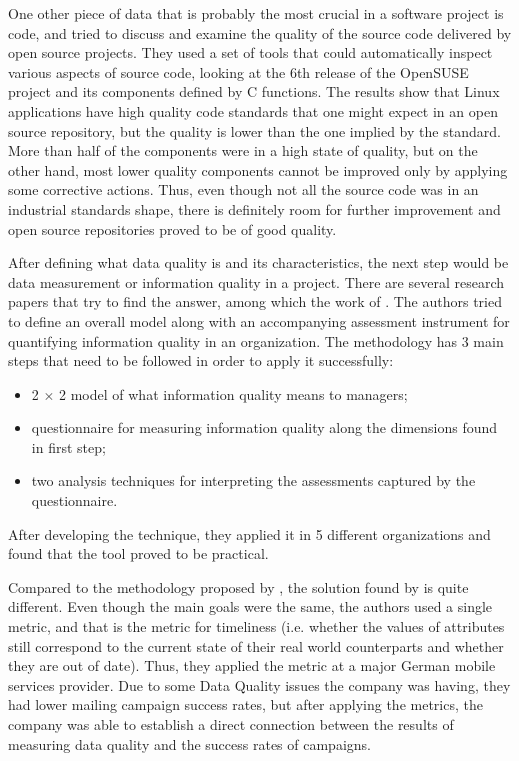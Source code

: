 \documentclass[11pt,english,twocolumn]{article}
\begin{document}
One other piece of data that is probably the most crucial in a software project
is code, and \cite{stamelos2002code} tried to discuss and examine the quality
of the source code delivered by open source projects. They used a set of tools
that could automatically inspect various aspects of source code, looking at
the 6th release of the OpenSUSE project and its components defined by C
functions. The results show that Linux applications have high quality 
code standards that one might expect in an open source repository, but 
the quality is lower than the one implied by the standard. More than half
of the components were in a high state of quality, but on the other hand, 
most lower quality components cannot be improved only by applying some
corrective actions. Thus, even though not all the source code was in 
an industrial standards shape, there is definitely room for further 
improvement and open source repositories proved to be of good quality.

After defining what data quality is and its characteristics, the next 
step would be data measurement or information quality in a project. 
There are several research papers that try to find the answer, among which the 
work of \cite{lee2002aimq}. The authors tried to define an overall model along 
with an accompanying assessment instrument for quantifying information quality 
in an organization. The methodology has 3 main steps that need to be followed 
in order to apply it successfully:
  \begin{itemize}
    \item 2 $\times$ 2 model of what information quality means to managers;
    \item questionnaire for measuring information quality along the dimensions
    found in first step;
    \item two analysis techniques for interpreting the assessments captured 
    by the questionnaire.
  \end{itemize} 
After developing the technique, they applied it in 5 different organizations and
found that the tool proved to be practical.

Compared to the methodology proposed by \cite{lee2002aimq}, the solution found
by \cite{Heinrich2007MetricsDataQuality} is quite different. Even though the 
main goals were the same, the authors used a single metric, and that is 
the metric for timeliness (i.e. whether the values of attributes still 
correspond to the current state of their real world counterparts and whether 
they are out of date). Thus, they applied the metric at a major German mobile 
services provider. Due to some Data Quality issues the company was having, they 
had lower mailing campaign success rates, but after applying the metrics, the 
company was able to establish a direct connection between the results of
measuring data quality and the success rates of campaigns.
\end{document}
